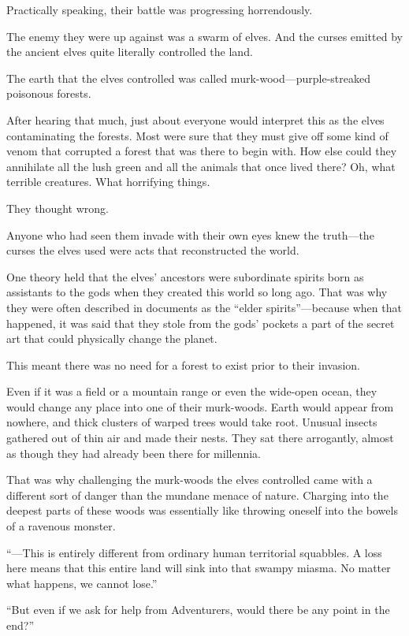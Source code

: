Practically speaking, their battle was progressing horrendously.

The enemy they were up against was a swarm of elves. And the curses emitted by the ancient elves quite literally controlled the land.

The earth that the elves controlled was called murk-wood—purple-streaked poisonous forests.

After hearing that much, just about everyone would interpret this as the elves contaminating the forests. Most were sure that they must give off some kind of venom that corrupted a forest that was there to begin with. How else could they annihilate all the lush green and all the animals that once lived there? Oh, what terrible creatures. What horrifying things.

They thought wrong.

Anyone who had seen them invade with their own eyes knew the truth—the curses the elves used were acts that reconstructed the world.

One theory held that the elves’ ancestors were subordinate spirits born as assistants to the gods when they created this world so long ago. That was why they were often described in documents as the “elder spirits”—because when that happened, it was said that they stole from the gods’ pockets a part of the secret art that could physically change the planet.

This meant there was no need for a forest to exist prior to their invasion.

Even if it was a field or a mountain range or even the wide-open ocean, they would change any place into one of their murk-woods. Earth would appear from nowhere, and thick clusters of warped trees would take root. Unusual insects gathered out of thin air and made their nests. They sat there arrogantly, almost as though they had already been there for millennia.

That was why challenging the murk-woods the elves controlled came with a different sort of danger than the mundane menace of nature. Charging into the deepest parts of these woods was essentially like throwing oneself into the bowels of a ravenous monster.

“—This is entirely different from ordinary human territorial squabbles. A loss here means that this entire land will sink into that swampy miasma. No matter what happens, we cannot lose.”

“But even if we ask for help from Adventurers, would there be any point in the end?”

